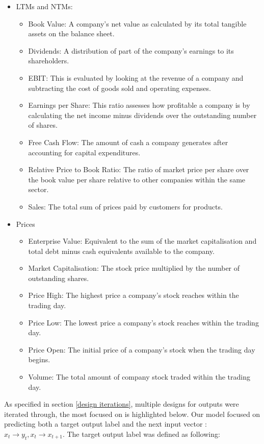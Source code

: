 \documentclass[10pt,onecolumn,letterpaper]{article}
\begin{document}
\begin{itemize}
	\item LTMs and NTMs: 
	\begin{itemize}
		\item Book Value: A company's net value as calculated by its total tangible assets on the balance sheet.  
		\item Dividends: A distribution of part of the company's earnings to its shareholders.
		\item EBIT: This is evaluated by looking at the revenue of a company and subtracting the cost of goods sold and operating expenses. 
		\item Earnings per Share: This ratio assesses how profitable a company is by calculating the net income minus dividends over the outstanding number of shares.  
		\item Free Cash Flow: The amount of cash a company generates after accounting for capital expenditures. 
		\item Relative Price to Book Ratio: The ratio of market price per share over the book value per share relative to other companies within the same sector. 
		\item Sales: The total sum of prices paid by customers for products. 
		
	\end{itemize}
	\item Prices
	\begin{itemize}
		\item Enterprise Value: Equivalent to the sum of the market capitalisation and total debt minus cash equivalents available to the company.
		\item Market Capitalisation: The stock price multiplied by the number of outstanding shares. 
		\item Price High: The highest price a company's stock reaches within the trading day. 
		\item Price Low: The lowest price a company's stock reaches within the trading day. 
		\item Price Open: The initial price of a company's stock when the trading day begins. 
		\item Volume: The total amount of company stock traded within the trading day.
	\end{itemize}
\end{itemize}

As specified in section \ref{design iterations}, multiple designs for outputs were iterated through, the most focused on is highlighted below. Our model focused on predicting both a target output label and the next input vector : $x_{t} \rightarrow y_{t}, x_{t} \rightarrow x_{t+1}$. The target output label was defined as following:
\end{document}
